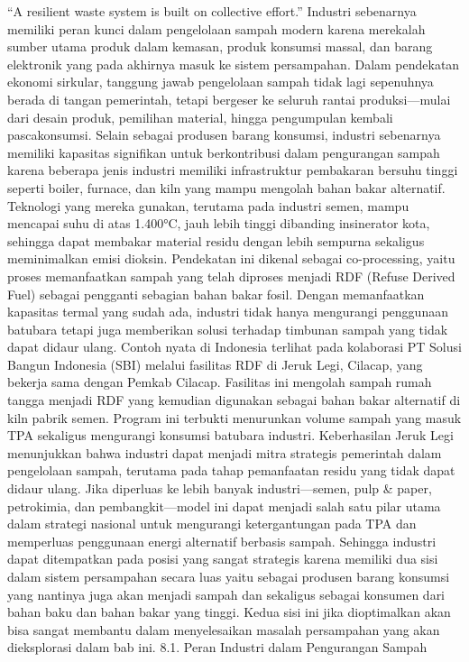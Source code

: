 \documentclass[
  letterpaper,
  DIV=11,
  numbers=noendperiod]{scrreprt}
\begin{document}
``A resilient waste system is built on collective effort.'' Industri
sebenarnya memiliki peran kunci dalam pengelolaan sampah modern karena
merekalah sumber utama produk dalam kemasan, produk konsumsi massal, dan
barang elektronik yang pada akhirnya masuk ke sistem persampahan. Dalam
pendekatan ekonomi sirkular, tanggung jawab pengelolaan sampah tidak
lagi sepenuhnya berada di tangan pemerintah, tetapi bergeser ke seluruh
rantai produksi---mulai dari desain produk, pemilihan material, hingga
pengumpulan kembali pascakonsumsi. Selain sebagai produsen barang
konsumsi, industri sebenarnya memiliki kapasitas signifikan untuk
berkontribusi dalam pengurangan sampah karena beberapa jenis industri
memiliki infrastruktur pembakaran bersuhu tinggi seperti boiler,
furnace, dan kiln yang mampu mengolah bahan bakar alternatif. Teknologi
yang mereka gunakan, terutama pada industri semen, mampu mencapai suhu
di atas 1.400°C, jauh lebih tinggi dibanding insinerator kota, sehingga
dapat membakar material residu dengan lebih sempurna sekaligus
meminimalkan emisi dioksin. Pendekatan ini dikenal sebagai
co-processing, yaitu proses memanfaatkan sampah yang telah diproses
menjadi RDF (Refuse Derived Fuel) sebagai pengganti sebagian bahan bakar
fosil. Dengan memanfaatkan kapasitas termal yang sudah ada, industri
tidak hanya mengurangi penggunaan batubara tetapi juga memberikan solusi
terhadap timbunan sampah yang tidak dapat didaur ulang. Contoh nyata di
Indonesia terlihat pada kolaborasi PT Solusi Bangun Indonesia (SBI)
melalui fasilitas RDF di Jeruk Legi, Cilacap, yang bekerja sama dengan
Pemkab Cilacap. Fasilitas ini mengolah sampah rumah tangga menjadi RDF
yang kemudian digunakan sebagai bahan bakar alternatif di kiln pabrik
semen. Program ini terbukti menurunkan volume sampah yang masuk TPA
sekaligus mengurangi konsumsi batubara industri. Keberhasilan Jeruk Legi
menunjukkan bahwa industri dapat menjadi mitra strategis pemerintah
dalam pengelolaan sampah, terutama pada tahap pemanfaatan residu yang
tidak dapat didaur ulang. Jika diperluas ke lebih banyak
industri---semen, pulp \& paper, petrokimia, dan pembangkit---model ini
dapat menjadi salah satu pilar utama dalam strategi nasional untuk
mengurangi ketergantungan pada TPA dan memperluas penggunaan energi
alternatif berbasis sampah. Sehingga industri dapat ditempatkan pada
posisi yang sangat strategis karena memiliki dua sisi dalam sistem
persampahan secara luas yaitu sebagai produsen barang konsumsi yang
nantinya juga akan menjadi sampah dan sekaligus sebagai konsumen dari
bahan baku dan bahan bakar yang tinggi. Kedua sisi ini jika dioptimalkan
akan bisa sangat membantu dalam menyelesaikan masalah persampahan yang
akan dieksplorasi dalam bab ini. 8.1. Peran Industri dalam Pengurangan
Sampah
\end{document}
